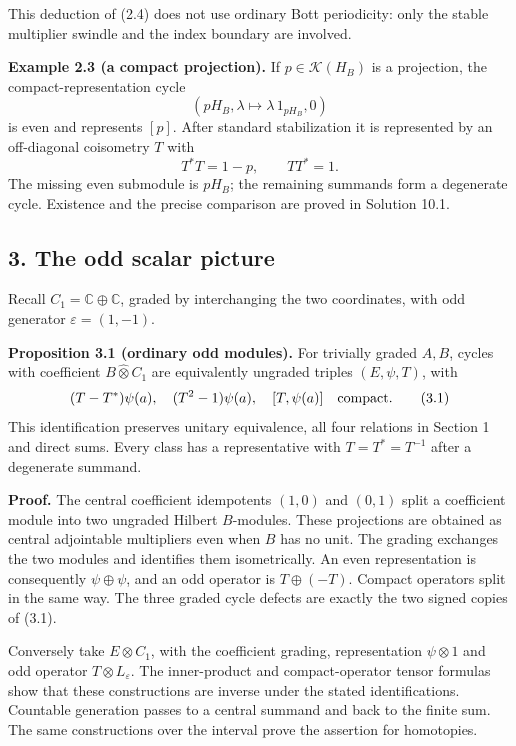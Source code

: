 \documentclass[
  11pt,
]{article}
\begin{document}
This deduction of (2.4) does not use ordinary Bott periodicity: only the
stable multiplier swindle and the index boundary are involved.

\textbf{Example 2.3 (a compact projection).} If \(p\in\mathcal K(H_B)\)
is a projection, the compact-representation cycle \[
(pH_B,\lambda\mapsto\lambda\,1_{pH_B},0)
\tag{2.6}
\] is even and represents \([p]\). After standard stabilization it is
represented by an off-diagonal coisometry \(T\) with \[
T^*T=1-p,\qquad TT^*=1.
\tag{2.7}
\] The missing even submodule is \(pH_B\); the remaining summands form a
degenerate cycle. Existence and the precise comparison are proved in
Solution 10.1.

\subsection{3. The odd scalar picture}\label{the-odd-scalar-picture}

Recall \(C_1=\mathbb C\oplus\mathbb C\), graded by interchanging the two
coordinates, with odd generator \(\varepsilon=(1,-1)\).

\textbf{Proposition 3.1 (ordinary odd modules).} For trivially graded
\(A,B\), cycles with coefficient \(B\widehat\otimes C_1\) are
equivalently ungraded triples \((E,\psi,T)\), with \[
(T-T^*)\psi(a),\quad(T^2-1)\psi(a),\quad[T,\psi(a)]
\quad\hbox{compact}.
\tag{3.1}
\] This identification preserves unitary equivalence, all four relations
in Section 1 and direct sums. Every class has a representative with
\(T=T^*=T^{-1}\) after a degenerate summand.

\textbf{Proof.} The central coefficient idempotents \((1,0)\) and
\((0,1)\) split a coefficient module into two ungraded Hilbert
\(B\)-modules. These projections are obtained as central adjointable
multipliers even when \(B\) has no unit. The grading exchanges the two
modules and identifies them isometrically. An even representation is
consequently \(\psi\oplus\psi\), and an odd operator is \(T\oplus(-T)\).
Compact operators split in the same way. The three graded cycle defects
are exactly the two signed copies of (3.1).

Conversely take \(E\otimes C_1\), with the coefficient grading,
representation \(\psi\otimes1\) and odd operator
\(T\otimes L_\varepsilon\). The inner-product and compact-operator
tensor formulas show that these constructions are inverse under the
stated identifications. Countable generation passes to a central summand
and back to the finite sum. The same constructions over the interval
prove the assertion for homotopies.
\end{document}
